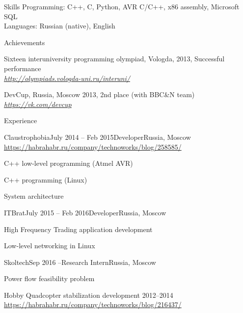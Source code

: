 \documentclass{resume} %
\begin{document}
\begin{rSection}{Skills}
Programming: C++, C, Python, AVR C/C++, x86 assembly, Microsoft SQL\\
Languages: Russian (native), English
\end{rSection}


\begin{rSection}{Achievements}
\item Sixteen interuniversity programming olympiad, Vologda, 2013, Successful performance \\
\hfill {\em \url{http://olympiads.vologda-uni.ru/interuni/}}
\item DevCup, Russia, Moscow 2013, 2nd place (with BBC\&N team)\\
\hfill {\em \url{https://vk.com/devcup}}
\end{rSection}
\newpage

\begin{rSection}{Experience}
	
	\begin{rSubsection}{Claustrophobia}{July 2014 -- Feb 2015}{Developer}{Russia, Moscow}
		\url{https://habrahabr.ru/company/technoworks/blog/258585/}
		\item C++ low-level programming (Atmel AVR)
		\item C++ programming (Linux)
		\item System architecture
	\end{rSubsection}
	
	
	\begin{rSubsection}{ITBrat}{July 2015 -- Feb 2016}{Developer}{Russia, Moscow}
		\item High Frequency Trading application development
		\item Low-level networking in Linux
	\end{rSubsection}
	\begin{rSubsection}{Skoltech}{Sep 2016 --}{Research Intern}{Russia, Moscow}
		\item Power flow feasibility problem
	\end{rSubsection}
	
	
\end{rSection}

\begin{rSection}{Hobby}
	Quadcopter stabilization development 2012--2014\\
	\url{https://habrahabr.ru/company/technoworks/blog/216437/}
\end{rSection}

\end{document}

